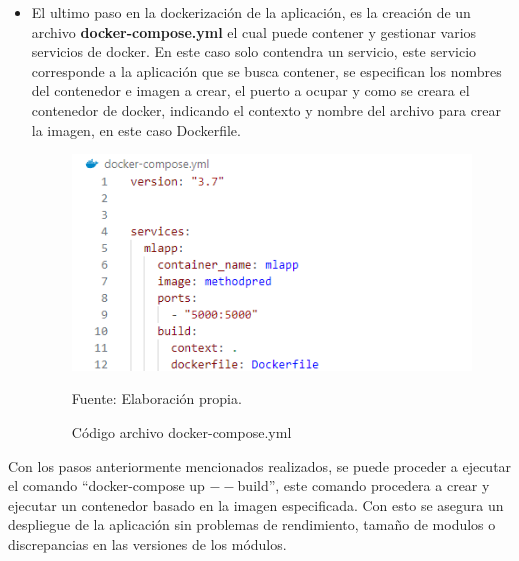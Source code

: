 \begin{itemize}
    \item El ultimo paso en la dockerización de la aplicación, es la creación de un archivo \textbf{docker-compose.yml} el cual puede contener y gestionar varios servicios de docker. En este caso solo contendra un servicio, este servicio corresponde a la aplicación que se busca contener, se especifican los nombres del contenedor e imagen a crear, el puerto a ocupar y como se creara el contenedor de docker, indicando el contexto y nombre del archivo para crear la imagen, en este caso Dockerfile.

    \begin{figure}[H]
        \begin{minipage}[t]{0.9\textwidth}
            \caption{Código archivo docker-compose.yml}
            \label{docker_compose}        
        \end{minipage}
    
        \vspace{10pt}
    
        \begin{minipage}[b]{1\textwidth}
            \centering
            \includegraphics[width=\textwidth]{img/docker-compose.png}        
        \end{minipage}
    
        \begin{minipage}[t]{0.9\textwidth}
            Fuente: Elaboración propia.
        \end{minipage}
    \end{figure}

\end{itemize}

Con los pasos anteriormente mencionados realizados, se puede proceder a ejecutar el comando \textquotedblleft docker-compose up $--$build\textquotedblright , este comando procedera a crear y ejecutar un contenedor basado en la imagen especificada. Con esto se asegura un despliegue de la aplicación sin problemas de rendimiento, tamaño de modulos o discrepancias en las versiones de los módulos.